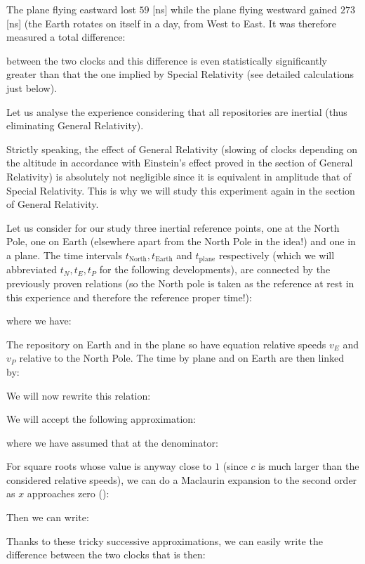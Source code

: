 	The plane flying eastward lost $59$ [ns] while the plane flying westward gained $273$ [ns] (the Earth rotates on itself in a day, from West to East. It was therefore measured a total difference:
	
	between the two clocks and this difference is even statistically significantly greater than that the one implied by Special Relativity (see detailed calculations just below).

	Let us analyse the experience considering that all repositories are inertial (thus eliminating General Relativity).
	\begin{tcolorbox}[title=Remark,colframe=black,arc=10pt]
	Strictly speaking, the effect of General Relativity (slowing of clocks depending on the altitude in accordance with Einstein's effect proved in the section of General Relativity) is absolutely not negligible since it is equivalent in amplitude that of Special Relativity. This is why we will study this experiment again in the section of General Relativity.
	\end{tcolorbox}
	Let us consider for our study  three inertial reference points, one at the North Pole, one on Earth (elsewhere apart from the North Pole in the idea!) and one in a plane. The time intervals $t_{\text{North}},t_{\text{Earth}}$ and $t_{\text{plane}}$ respectively (which we will abbreviated $t_N,t_E,t_P$ for the following developments), are connected by the previously proven relations (so the North pole is taken as the reference at rest in this experience and therefore the reference proper time!):
	
	where we have:
	
	The repository on Earth and in the plane so have equation relative speeds $v_E$ and $v_P$ relative to the North Pole. The time by plane and on Earth are then linked by:
	
	We will now rewrite this relation:
	
	We will accept the following approximation:
	
	where we have assumed that at the denominator:
	
	For square roots whose value is anyway close to $1$ (since $c$ is much larger than the considered relative speeds), we can do a Maclaurin expansion to the second order as $x$ approaches zero ():
	
	Then we can write:
	
	Thanks to these tricky successive approximations, we can easily write the difference between the two clocks that is then:
	
